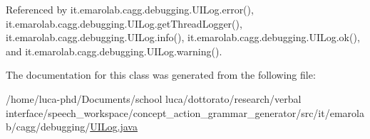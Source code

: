 Referenced by it.\-emarolab.\-cagg.\-debugging.\-U\-I\-Log.\-error(), it.\-emarolab.\-cagg.\-debugging.\-U\-I\-Log.\-get\-Thread\-Logger(), it.\-emarolab.\-cagg.\-debugging.\-U\-I\-Log.\-info(), it.\-emarolab.\-cagg.\-debugging.\-U\-I\-Log.\-ok(), and it.\-emarolab.\-cagg.\-debugging.\-U\-I\-Log.\-warning().



The documentation for this class was generated from the following file\-:\begin{DoxyCompactItemize}
\item 
/home/luca-\/phd/\-Documents/school luca/dottorato/research/verbal interface/speech\-\_\-workspace/concept\-\_\-action\-\_\-grammar\-\_\-generator/src/it/emarolab/cagg/debugging/\hyperlink{UILog_8java}{U\-I\-Log.\-java}\end{DoxyCompactItemize}
